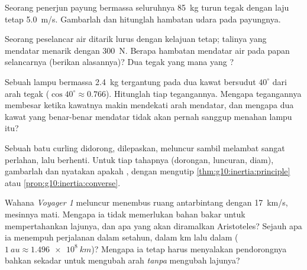 \begin{exercise}[$\star\star$]\label{exo:g10:inertia:10}
Seorang penerjun payung bermassa seluruhnya \qty{85}{kg} turun tegak
dengan laju tetap \qty{5.0}{m/s}. Gambarlah  dan
hitunglah hambatan udara pada payungnya.
\end{exercise}

\begin{exercise}[$\star\star$]\label{exo:g10:inertia:11}
Seorang peselancar air ditarik lurus dengan kelajuan tetap; talinya yang
mendatar menarik dengan \qty{300}{N}. Berapa hambatan mendatar air pada
papan selancarnya (berikan alasannya)? Dua  tegak yang mana yang
?
\end{exercise}

\begin{exercise}[$\star\star\star$]\label{exo:g10:inertia:12}
Sebuah lampu bermassa \qty{2.4}{kg} tergantung pada dua kawat bersudut
$40^\circ$ dari arah tegak ($\cos 40^\circ \approx 0.766$). Hitunglah
tiap tegangannya. Mengapa tegangannya membesar ketika kawatnya makin
mendekati arah mendatar, dan mengapa dua kawat yang benar-benar
mendatar tidak akan pernah sanggup menahan lampu itu?
\end{exercise}

\begin{exercise}[$\star\star\star$]\label{exo:g10:inertia:13}
Sebuah batu curling didorong, dilepaskan, meluncur sambil melambat
sangat perlahan, lalu berhenti. Untuk tiap tahapnya (dorongan,
luncuran, diam), gambarlah  dan nyatakan apakah 
, dengan mengutip
\cref{thm:g10:inertia:principle} atau \cref{prop:g10:inertia:converse}.
\end{exercise}

\begin{exercise}[$\star\star\star$]\label{exo:g10:inertia:14}
Wahana \emph{Voyager 1} meluncur menembus ruang antarbintang dengan
\qty{17}{km/s}, mesinnya mati. Mengapa ia tidak memerlukan bahan bakar
untuk mempertahankan lajunya, dan apa yang akan diramalkan Aristoteles?
Sejauh apa ia menempuh perjalanan dalam setahun, dalam \unit{km} lalu
dalam  ($\qty{1}{au} \approx
\qty{1.496e8}{km}$)?
Mengapa ia tetap harus menyalakan pendorongnya bahkan sekadar untuk
mengubah arah \emph{tanpa} mengubah lajunya?
\end{exercise}

